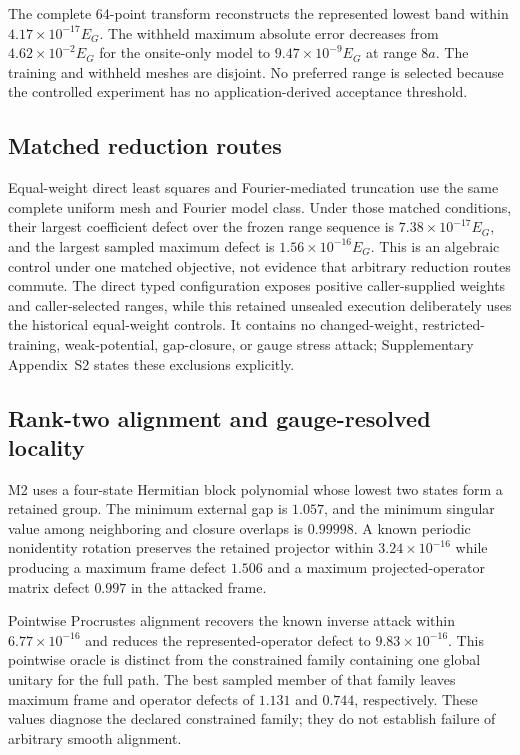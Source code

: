 \documentclass[preprint,12pt]{elsarticle}
\begin{document}
The complete 64-point transform reconstructs the represented lowest band
within $4.17\times10^{-17}E_G$. The withheld maximum absolute error decreases
from $4.62\times10^{-2}E_G$ for the onsite-only model to
$9.47\times10^{-9}E_G$ at range $8a$. The training and withheld meshes are
disjoint. No preferred range is selected because the controlled experiment has
no application-derived acceptance threshold.

\subsection{Matched reduction routes}
\label{sec:matched-routes}

Equal-weight direct least squares and Fourier-mediated truncation use the same
complete uniform mesh and Fourier model class. Under those matched conditions,
their largest coefficient defect over the frozen range sequence is
$7.38\times10^{-17}E_G$, and the largest sampled maximum defect is
$1.56\times10^{-16}E_G$. This is an algebraic control under one matched objective,
not evidence that arbitrary reduction routes commute. The direct typed configuration
exposes positive caller-supplied weights and caller-selected ranges, while this
retained unsealed execution deliberately uses the historical equal-weight controls. It contains no
changed-weight, restricted-training, weak-potential, gap-closure, or gauge stress
attack; Supplementary Appendix~S2 states these exclusions explicitly.

\subsection{Rank-two alignment and gauge-resolved locality}
\label{sec:multiband-alignment}

M2 uses a four-state Hermitian block polynomial whose lowest two states form a
retained group. The minimum external gap is $1.057$, and the minimum singular
value among neighboring and closure overlaps is $0.99998$. A known periodic
nonidentity rotation preserves the retained projector within
$3.24\times10^{-16}$ while producing a maximum frame defect $1.506$ and a
maximum projected-operator matrix defect $0.997$ in the attacked frame.

Pointwise Procrustes alignment recovers the known inverse attack within
$6.77\times10^{-16}$ and reduces the represented-operator defect to
$9.83\times10^{-16}$. This pointwise oracle is distinct from the constrained
family containing one global unitary for the full path. The best sampled member
of that family leaves maximum frame and operator defects of $1.131$ and $0.744$,
respectively. These values diagnose the declared constrained family; they do
not establish failure of arbitrary smooth alignment.
\end{document}
